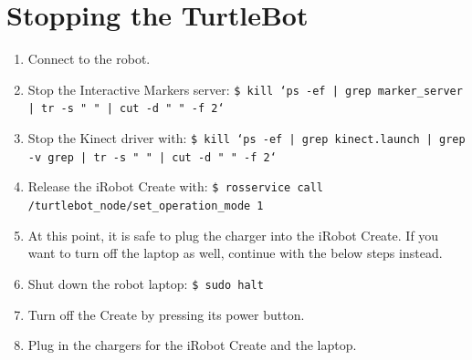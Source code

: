 \documentclass[12pt]{report}
\begin{document}
\section{Stopping the TurtleBot}
\begin{sloppypar}
\begin{enumerate}
\item{Connect to the robot.}
\item{Stop the Interactive Markers server: \texttt{\$\ kill `ps -ef | grep marker\_server | tr -s " " | cut -d " " -f 2`}}
\item{Stop the Kinect driver with: \texttt{\$\ kill `ps -ef | grep kinect.launch | grep -v grep | tr -s " " | cut -d " " -f 2`}}
\item{Release the iRobot Create with: \texttt{\$\ rosservice call /turtlebot\_node/set\_operation\_mode 1}}
\item{At this point, it is safe to plug the charger into the iRobot Create.  If you want to turn off the laptop as well, continue with the below steps instead.}
\item{Shut down the robot laptop: \texttt{\$\ sudo halt}}
\item{Turn off the Create by pressing its power button.}
\item{Plug in the chargers for the iRobot Create and the laptop.}
\end{enumerate}
\end{sloppypar}
\end{document}
